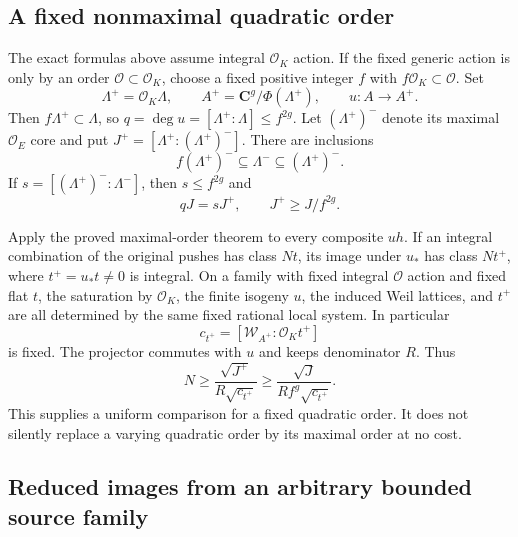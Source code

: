 \documentclass[11pt,a4paper]{article}
\theoremstyle{definition}
\begin{document}
\subsection{A fixed nonmaximal quadratic order}\label{a-fixed-nonmaximal-quadratic-order}

The exact formulas above assume integral \(\mathcal O_K\) action. If the fixed generic action is only by an order \(\mathcal O\subset\mathcal O_K\), choose a fixed positive integer \(f\) with \(f\mathcal O_K\subset\mathcal O\). Set \[
 \Lambda^+=\mathcal O_K\Lambda,
 \qquad A^+=\mathbf C^g/\Phi(\Lambda^+),
 \qquad u:A\to A^+.
\] Then \(f\Lambda^+\subset\Lambda\), so \(q=\deg u=[\Lambda^+:\Lambda]\le f^{2g}\). Let \((\Lambda^+)^-\) denote its maximal \(\mathcal O_E\) core and put \(J^+=[\Lambda^+:(\Lambda^+)^-]\). There are inclusions \[
 f(\Lambda^+)^-\subseteq\Lambda^-\subseteq(\Lambda^+)^-.
\] If \(s=[(\Lambda^+)^-:\Lambda^-]\), then \(s\le f^{2g}\) and \[
 qJ=sJ^+,
 \qquad J^+\ge J/f^{2g}.
\tag{B23.15}
\]

Apply the proved maximal-order theorem to every composite \(uh\). If an integral combination of the original pushes has class \(Nt\), its image under \(u_*\) has class \(N t^+\), where \(t^+=u_*t\ne0\) is integral. On a family with fixed integral \(\mathcal O\) action and fixed flat \(t\), the saturation by \(\mathcal O_K\), the finite isogeny \(u\), the induced Weil lattices, and \(t^+\) are all determined by the same fixed rational local system. In particular \[
 c_{t^+}=[\mathscr W_{A^+}:\mathcal O_Kt^+]
\] is fixed. The projector commutes with \(u\) and keeps denominator \(R\). Thus \[
 N\ge\frac{\sqrt{J^+}}{R\sqrt{c_{t^+}}}
 \ge\frac{\sqrt J}{R f^g\sqrt{c_{t^+}}}.
\tag{B23.16}
\] This supplies a uniform comparison for a fixed quadratic order. It does not silently replace a varying quadratic order by its maximal order at no cost.

\subsection{Reduced images from an arbitrary bounded source family}\label{reduced-images-from-an-arbitrary-bounded-source-family}
\end{document}

